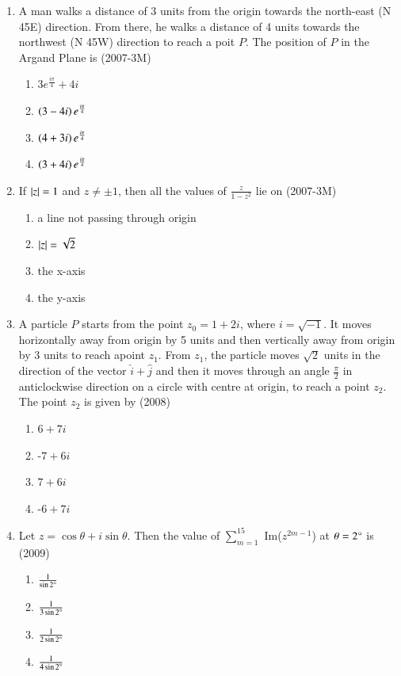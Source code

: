 \documentclass[journal,12pt,twocolumn]{IEEEtran}
\theoremstyle{remark}
\begin{document}
\begin{enumerate}
\item A man walks a distance of 3 units from the origin towards the north-east (N 45\degree E) direction. From there, he walks a distance of 4 units towards the northwest (N 45\degree W) direction to reach a poit $P$. The position of $P$ in the Argand Plane is \hfill{(2007-3M)}
	\begin{multicols}{2}
\begin{enumerate}
	\item $3e^{\frac{i\pi}{4}}+4i$
	\item $\left(3-4i\right)e^{\frac{i\pi}{4}}$
	\item $\left(4+3i\right)e^{\frac{i\pi}{4}}$
	\item $\left(3+4i\right)e^{\frac{i\pi}{4}}$
\end{enumerate}
	\end{multicols}

\item If $\left\vert z\right\vert=1$ and $z\neq\pm1$, then all the values of $\frac{z}{1-z^{2}}$ lie on \hfill{(2007-3M)}
\begin{enumerate}
	\item a line not passing through origin
	\item $\left\vert z\right\vert=\sqrt{2}$
	\item the x-axis
	\item the y-axis
\end{enumerate}

\item A particle $P$ starts from the point $z_{0}=1+2i$, where $i=\sqrt{-1}$. It moves horizontally away from origin by 5 units and then vertically away from origin by 3 units to reach apoint $z_{1}$. From $z_{1}$, the particle moves $\sqrt{2}$ units in the direction of the vector $\hat{i}+\hat{j}$ and then it moves through an angle $\frac{\pi}{2}$ in anticlockwise direction on a circle with centre at origin, to reach a point $z_{2}$. The point $z_{2}$ is given by \hfill{(2008)}
	\begin{multicols}{2}
\begin{enumerate}
	\item $6+7i$
	\item -$7+6i$
	\item $7+6i$
	\item -$6+7i$
\end{enumerate}
	\end{multicols}

\item Let $z=\cos\theta+i\sin\theta$. Then the value of $\sum_{m=1} ^{15}$ Im($z^{2m-1}$) at $\theta=2\degree$ is \hfill{(2009)}
	\begin{multicols}{4}
\begin{enumerate}
	\item $\frac{1}{\sin 2\degree}$
	\item $\frac{1}{3\sin 2\degree}$
	\item $\frac{1}{2\sin 2\degree}$
	\item $\frac{1}{4\sin 2\degree}$
\end{enumerate}
	\end{multicols}


\end{enumerate}
\end{document}
